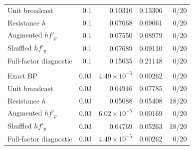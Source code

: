 \begin{table}[!htbp]
\begin{tabular}{lrrrr}
Unit broadcast & 0.1 & 0.10310 & 0.13306 & 0/20 \\
Resistance $h$ & 0.1 & 0.07668 & 0.09061 & 0/20 \\
Augmented $h f'_p$ & 0.1 & 0.07550 & 0.08979 & 0/20 \\
Shuffled $h f'_p$ & 0.1 & 0.07689 & 0.09110 & 0/20 \\
Full-factor diagnostic & 0.1 & 0.15035 & 0.21148 & 0/20 \\
\addlinespace
\multicolumn{5}{l}{Adam; common rate; bounds $[-9,9]$} \\
Exact BP & 0.03 & $4.49\times10^{-5}$ & 0.00262 & 0/20 \\
Unit broadcast & 0.03 & 0.04946 & 0.07785 & 0/20 \\
Resistance $h$ & 0.03 & 0.05088 & 0.05408 & 18/20 \\
Augmented $h f'_p$ & 0.03 & $6.02\times10^{-5}$ & 0.00169 & 0/20 \\
Shuffled $h f'_p$ & 0.03 & 0.04769 & 0.05263 & 18/20 \\
Full-factor diagnostic & 0.03 & $4.49\times10^{-5}$ & 0.00262 & 0/20 \\
\bottomrule
\end{tabular}
\end{table}
